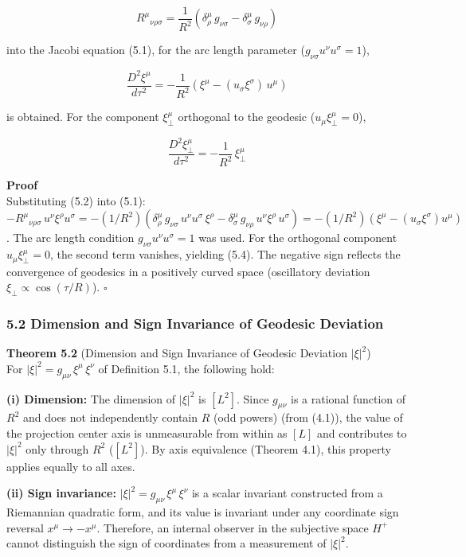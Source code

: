 \documentclass[a4paper,11pt]{article}
\theoremstyle{definition}
\begin{document}
\[R^\mu{}_{\nu\rho\sigma} = \frac{1}{R^2}(\delta^\mu_\rho\, g_{\nu\sigma} - \delta^\mu_\sigma\, g_{\nu\rho}) \tag{5.2}\]

into the Jacobi equation (5.1), for the arc length parameter (\(g_{\nu\sigma}u^\nu u^\sigma = 1\)),

\[\frac{D^2 \xi^\mu}{d\tau^2} = -\frac{1}{R^2}\left(\xi^\mu - (u_\sigma \xi^\sigma)\, u^\mu\right) \tag{5.3}\]

is obtained. For the component \(\xi^\mu_\perp\) orthogonal to the geodesic (\(u_\mu \xi^\mu_\perp = 0\)),

\[\frac{D^2 \xi^\mu_\perp}{d\tau^2} = -\frac{1}{R^2}\,\xi^\mu_\perp \tag{5.4}\]

\textbf{Proof}\\
Substituting (5.2) into (5.1): \(-R^\mu{}_{\nu\rho\sigma}\, u^\nu \xi^\rho u^\sigma = -(1/R^2)(\delta^\mu_\rho\, g_{\nu\sigma}\, u^\nu u^\sigma\, \xi^\rho - \delta^\mu_\sigma\, g_{\nu\rho}\, u^\nu \xi^\rho\, u^\sigma) = -(1/R^2)(\xi^\mu - (u_\sigma\xi^\sigma)u^\mu)\). The arc length condition \(g_{\nu\sigma}u^\nu u^\sigma = 1\) was used. For the orthogonal component \(u_\mu\xi^\mu_\perp = 0\), the second term vanishes, yielding (5.4). The negative sign reflects the convergence of geodesics in a positively curved space (oscillatory deviation \(\xi_\perp \propto \cos(\tau/R)\)). \(\square\)

\subsubsection{5.2 Dimension and Sign Invariance of Geodesic Deviation}\label{dimension-and-sign-invariance-of-geodesic-deviation}

\textbf{Theorem 5.2} (Dimension and Sign Invariance of Geodesic Deviation \(|\xi|^2\))\\
For \(|\xi|^2 = g_{\mu\nu}\,\xi^\mu\,\xi^\nu\) of Definition 5.1, the following hold:

\textbf{(i) Dimension:} The dimension of \(|\xi|^2\) is \([L^2]\). Since \(g_{\mu\nu}\) is a rational function of \(R^2\) and does not independently contain \(R\) (odd powers) (from (4.1)), the value of the projection center axis is unmeasurable from within as \([L]\) and contributes to \(|\xi|^2\) only through \(R^2\) (\([L^2]\)). By axis equivalence (Theorem 4.1), this property applies equally to all axes.

\textbf{(ii) Sign invariance:} \(|\xi|^2 = g_{\mu\nu}\,\xi^\mu\,\xi^\nu\) is a scalar invariant constructed from a Riemannian quadratic form, and its value is invariant under any coordinate sign reversal \(x^\mu \to -x^\mu\). Therefore, an internal observer in the subjective space \(H^+\) cannot distinguish the sign of coordinates from a measurement of \(|\xi|^2\).
\end{document}
